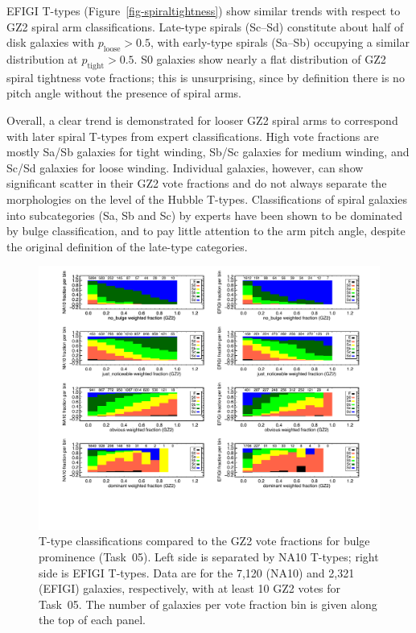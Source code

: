 \documentclass[useAMS,usenatbib]{mn2e}
\begin{document}
EFIGI T-types (Figure~\ref{fig-spiraltightness}) show similar trends with respect to GZ2 spiral arm classifications. Late-type spirals (Sc--Sd) constitute about half of disk galaxies with $p_\mathrm{loose}>0.5$, with early-type spirals (Sa--Sb) occupying a similar distribution at $p_\mathrm{tight}>0.5$. S0 galaxies show nearly a flat distribution of GZ2 spiral tightness vote fractions; this is unsurprising, since by definition there is no pitch angle without the presence of spiral arms.

Overall, a clear trend is demonstrated for looser GZ2 spiral arms to correspond with later spiral T-types from expert classifications. High vote fractions are mostly Sa/Sb galaxies for tight winding, Sb/Sc galaxies for medium winding, and Sc/Sd galaxies for loose winding. Individual galaxies, however, can show significant scatter in their GZ2 vote fractions and do not always separate the morphologies on the level of the Hubble T-types. Classifications of spiral galaxies into subcategories (Sa, Sb and Sc) by experts have been shown to be dominated by bulge classification, and to pay little attention to the arm pitch angle, despite the original definition of the late-type categories. 

\begin{figure}
\includegraphics[angle=0,width=7.0in]{figures/bulgeprominence_color.pdf}
\caption{T-type classifications compared to the GZ2 vote fractions for bulge prominence (Task~05). Left side is separated by NA10 T-types; right side is EFIGI T-types. Data are for the 7,120 (NA10) and 2,321 (EFIGI) galaxies, respectively, with at least 10 GZ2 votes for Task~05. The number of galaxies per vote fraction bin is given along the top of each panel. 
\label{fig-bulgeprominence}}
\end{figure}
\end{document}
